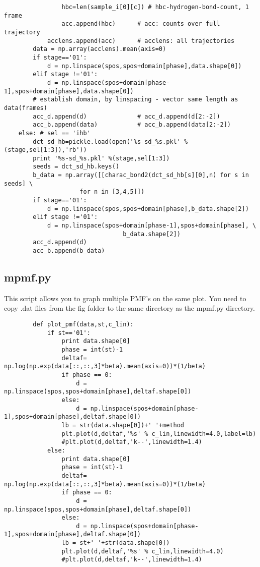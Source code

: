 \documentclass[11pt]{article}
\begin{document}
\begin{verbatim}
                hbc=len(sample_i[0][c]) # hbc-hydrogen-bond-count, 1 frame
                acc.append(hbc)      # acc: counts over full trajectory
            acclens.append(acc)      # acclens: all trajectories
        data = np.array(acclens).mean(axis=0)
        if stage=='01':
            d = np.linspace(spos,spos+domain[phase],data.shape[0])
        elif stage !='01':
            d = np.linspace(spos+domain[phase-1],spos+domain[phase],data.shape[0])
        # establish domain, by linspacing - vector same length as data(frames)
        acc_d.append(d)              # acc_d.append(d[2:-2])
        acc_b.append(data)           # acc_b.append(data[2:-2])
    else: # sel == 'ihb'
        dct_sd_hb=pickle.load(open('%s-sd_%s.pkl' % (stage,sel[1:3]),'rb'))
        print '%s-sd_%s.pkl' %(stage,sel[1:3])
        seeds = dct_sd_hb.keys()
        b_data = np.array([[charac_bond2(dct_sd_hb[s][0],n) for s in seeds] \
                     for n in [3,4,5]])
        if stage=='01':
            d = np.linspace(spos,spos+domain[phase],b_data.shape[2])
        elif stage !='01':
            d = np.linspace(spos+domain[phase-1],spos+domain[phase], \
                                 b_data.shape[2])
        acc_d.append(d)
        acc_b.append(b_data)
\end{verbatim}


\subsection{mpmf.py}
This script allows you to graph multiple PMF's on the same plot. You need to copy .dat files from the fig folder to the same directory as the mpmf.py directory.
\begin{verbatim}
        def plot_pmf(data,st,c_lin):
            if st=='01':
                print data.shape[0]
                phase = int(st)-1
                deltaf= np.log(np.exp(data[::,::,3]*beta).mean(axis=0))*(1/beta)
                if phase == 0:
                    d = np.linspace(spos,spos+domain[phase],deltaf.shape[0])
                else:
                    d = np.linspace(spos+domain[phase-1],spos+domain[phase],deltaf.shape[0])
                lb = str(data.shape[0])+' '+method
                plt.plot(d,deltaf,'%s' % c_lin,linewidth=4.0,label=lb)
                #plt.plot(d,deltaf,'k--',linewidth=1.4)
            else:
                print data.shape[0]
                phase = int(st)-1
                deltaf= np.log(np.exp(data[::,::,3]*beta).mean(axis=0))*(1/beta)
                if phase == 0:
                    d = np.linspace(spos,spos+domain[phase],deltaf.shape[0])
                else:
                    d = np.linspace(spos+domain[phase-1],spos+domain[phase],deltaf.shape[0])
                lb = st+' '+str(data.shape[0])
                plt.plot(d,deltaf,'%s' % c_lin,linewidth=4.0)
                #plt.plot(d,deltaf,'k--',linewidth=1.4)
\end{verbatim}

\end{document}
